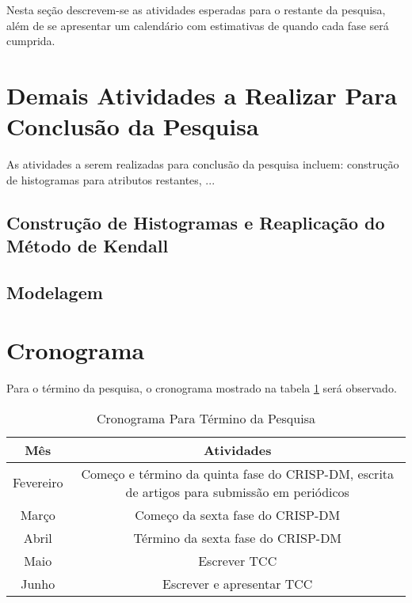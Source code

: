 Nesta seção descrevem-se as atividades esperadas para o restante da pesquisa, além de
se apresentar um calendário com estimativas de quando cada fase será cumprida. 
\section{Demais Atividades a Realizar Para Conclusão da Pesquisa}
As atividades a serem realizadas para conclusão da pesquisa incluem: construção de
histogramas para atributos restantes, ...
\subsection{Construção de Histogramas e Reaplicação do Método de Kendall}

\subsection{Modelagem}

\section{Cronograma}
Para o término da pesquisa, o cronograma mostrado na tabela \ref{cronograma} será
observado.
\begin{table}[htb]
\begin{center}
\begin{tabular}[c]{| c | c |}
    \hline
    \textbf{Mês} & \textbf{Atividades} \\
    \hline
    Fevereiro & Começo e término da quinta fase do CRISP-DM, escrita de artigos para
    submissão em periódicos\\
    \hline
    \hline
    Março & Começo da sexta fase do CRISP-DM \\
    \hline
    \hline
    Abril & Término da sexta fase do CRISP-DM \\
    \hline
    \hline
    Maio & Escrever TCC\\
    \hline
    \hline
    Junho & Escrever e apresentar TCC\\
    \hline
\end{tabular}
\end{center}
\caption{Cronograma Para Término da Pesquisa}
\label{cronograma}
\end{table}

